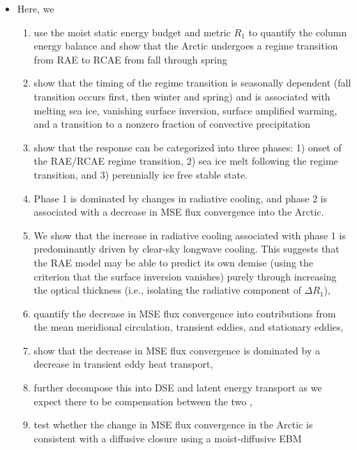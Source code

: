 \documentclass{article}
\begin{document}
\begin{itemize}
    \item Here, we 
    \begin{enumerate}
        \item use the moist static energy budget and metric $R_1$ to quantify the column energy balance and show that the Arctic undergoes a regime transition from RAE to RCAE from fall through spring
        \item show that the timing of the regime transition is seasonally dependent (fall transition occurs first, then winter and spring) and is associated with melting sea ice, vanishing surface inversion, surface amplified warming, and a transition to a nonzero fraction of convective precipitation
        \item show that the response can be categorized into three phases: 1) onset of the RAE/RCAE regime transition, 2) sea ice melt following the regime transition, and 3) perennially ice free stable state.
        \item Phase 1 is dominated by changes in radiative cooling, and phase 2 is associated with a decrease in MSE flux convergence into the Arctic.
        \item We show that the increase in radiative cooling associated with phase 1 is predominantly driven by clear-sky longwave cooling. This suggests that the RAE model \citep{cronin2016} may be able to predict its own demise (using the criterion that the surface inversion vanishes) purely through increasing the optical thickness (i.e., isolating the radiative component of $\Delta R_1$),
        \item quantify the decrease in MSE flux convergence into contributions from the mean meridional circulation, transient eddies, and stationary eddies,
        \item show that the decrease in MSE flux convergence is dominated by a decrease in transient eddy heat transport,
        \item further decompose this into DSE and latent energy transport as we expect there to be compensation between the two \citep{feldl2017},
        \item test whether the change in MSE flux convergence in the Arctic is consistent with a diffusive closure using a moist-diffusive EBM
    \end{enumerate}
\end{itemize}

\end{document}
